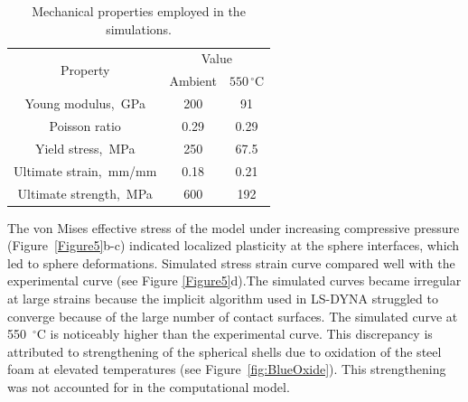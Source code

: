 \documentclass[review]{elsarticle}
\begin{document}
\begin{table}[htbp]
	\centering
	\caption{Mechanical properties employed in the simulations.}
	\begin{tabular}{ccc}
		\toprule
		\multirow{2}[0]{*}{Property} & \multicolumn{2}{c}{Value} \\
		& Ambient & $550\,^{\circ}\mathrm{C}$ \\
		\midrule
		Young modulus,~GPa & 200 & 91 \\
		Poisson ratio & 0.29  & 0.29 \\
		Yield stress,~MPa & 250 & 67.5 \\
		Ultimate strain,~mm/mm & 0.18  & 0.21 \\
		Ultimate strength,~MPa & 600 & 192 \\
		\bottomrule
	\end{tabular}%
	\label{Tab2}%
\end{table}%

The von Mises effective stress of the model under increasing compressive pressure (Figure~\ref{Figure5}b-c) indicated localized plasticity at the sphere interfaces, which led to sphere deformations. Simulated stress strain curve compared well with the experimental curve (see Figure \ref{Figure5}d).The simulated curves became irregular at large strains because the implicit algorithm used in LS-DYNA struggled to converge because of the large number of contact surfaces. The simulated curve at 550~$^{\circ}\mathrm{C}$ is noticeably higher than the experimental curve. This discrepancy is attributed to strengthening of the spherical shells due to oxidation of the steel foam at elevated temperatures (see Figure~\ref{fig:BlueOxide}). This strengthening was not accounted for in the computational model.
\end{document}
